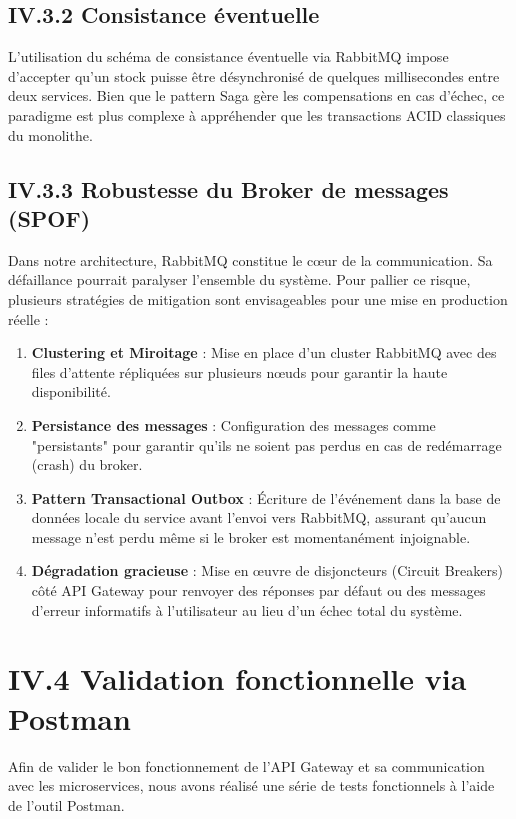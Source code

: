 \subsection{IV.3.2 Consistance éventuelle}
L'utilisation du schéma de consistance éventuelle via RabbitMQ impose d'accepter qu'un stock puisse être désynchronisé de quelques millisecondes entre deux services. Bien que le pattern Saga gère les compensations en cas d'échec, ce paradigme est plus complexe à appréhender que les transactions ACID classiques du monolithe.

\subsection{IV.3.3 Robustesse du Broker de messages (SPOF)}
Dans notre architecture, RabbitMQ constitue le cœur de la communication. Sa défaillance pourrait paralyser l'ensemble du système. Pour pallier ce risque, plusieurs stratégies de mitigation sont envisageables pour une mise en production réelle :
\begin{enumerate}[label=\alph*)]
    \item \textbf{Clustering et Miroitage} : Mise en place d'un cluster RabbitMQ avec des files d'attente répliquées sur plusieurs nœuds pour garantir la haute disponibilité.
    \item \textbf{Persistance des messages} : Configuration des messages comme "persistants" pour garantir qu'ils ne soient pas perdus en cas de redémarrage (crash) du broker.
    \item \textbf{Pattern Transactional Outbox} : Écriture de l'événement dans la base de données locale du service avant l'envoi vers RabbitMQ, assurant qu'aucun message n'est perdu même si le broker est momentanément injoignable.
    \item \textbf{Dégradation gracieuse} : Mise en œuvre de disjoncteurs (Circuit Breakers) côté API Gateway pour renvoyer des réponses par défaut ou des messages d'erreur informatifs à l'utilisateur au lieu d'un échec total du système.
\end{enumerate}


\section{IV.4 Validation fonctionnelle via Postman}
Afin de valider le bon fonctionnement de l'API Gateway et sa communication avec les microservices, nous avons réalisé une série de tests fonctionnels à l'aide de l'outil Postman.

